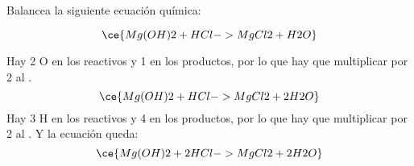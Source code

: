 Balancea la siguiente ecuación química:

\[
    \ce{Mg(OH)2 + HCl -> MgCl2 + H2O}
\]

\begin{solutionbox}{3.5cm}
    Hay  2 O en los reactivos y 1 en los productos, por lo que hay que multiplicar por 2 al .
    \[
        \ce{Mg(OH)2 + HCl -> MgCl2 + 2H2O}
    \]
    Hay 3 H en los reactivos y 4 en los productos, por lo que hay que multiplicar por 2 al . Y la ecuación queda:
    \[
        \ce{Mg(OH)2 + 2HCl -> MgCl2 + 2H2O}
    \]
\end{solutionbox}